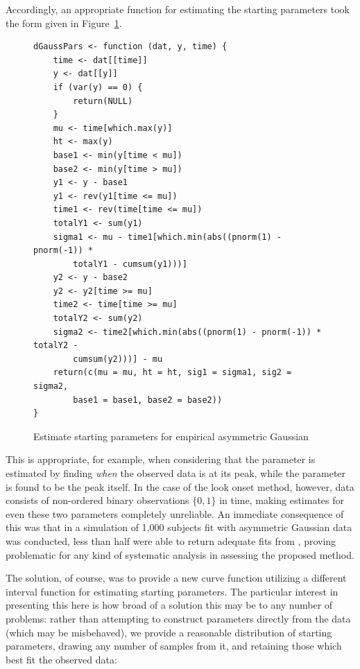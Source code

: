 Accordingly, an appropriate function for estimating the starting parameters took the form given in Figure~\ref{fig:gauss_form}.


\begin{singlespace}
\begin{figure}[H]
\centering
\begin{BVerbatim}
dGaussPars <- function (dat, y, time) {
    time <- dat[[time]]
    y <- dat[[y]]
    if (var(y) == 0) {
        return(NULL)
    }
    mu <- time[which.max(y)]
    ht <- max(y)
    base1 <- min(y[time < mu])
    base2 <- min(y[time > mu])
    y1 <- y - base1
    y1 <- rev(y1[time <= mu])
    time1 <- rev(time[time <= mu])
    totalY1 <- sum(y1)
    sigma1 <- mu - time1[which.min(abs((pnorm(1) - pnorm(-1)) * 
        totalY1 - cumsum(y1)))]
    y2 <- y - base2
    y2 <- y2[time >= mu]
    time2 <- time[time >= mu]
    totalY2 <- sum(y2)
    sigma2 <- time2[which.min(abs((pnorm(1) - pnorm(-1)) * totalY2 - 
        cumsum(y2)))] - mu
    return(c(mu = mu, ht = ht, sig1 = sigma1, sig2 = sigma2, 
        base1 = base1, base2 = base2))
}
\end{BVerbatim}
\caption{Estimate starting parameters for empirical asymmetric Gaussian}
\label{fig:gauss_form}
\end{figure}
\end{singlespace}

This is appropriate, for example, when considering that the  parameter is estimated by finding \textit{when} the observed data is at its peak, while the  parameter is found to be the peak itself. In the case of the look onset method, however, data consists of non-ordered binary observations $\{0,1\}$ in time, making estimates for even these two parameters completely unreliable. An immediate consequence of this was that in a simulation of 1,000 subjects fit with asymmetric Gaussian data was conducted, less than half were able to return adequate fits from , proving problematic for any kind of systematic analysis in assessing the proposed method.

The solution, of course, was to provide a new curve function utilizing a different interval function for estimating starting parameters. The particular interest in presenting this here is how broad of a solution this may be to any number of problems: rather than attempting to construct parameters directly from the data (which may be misbehaved), we provide a reasonable distribution of starting parameters, drawing any number of samples from it, and retaining those which best fit the observed data:

